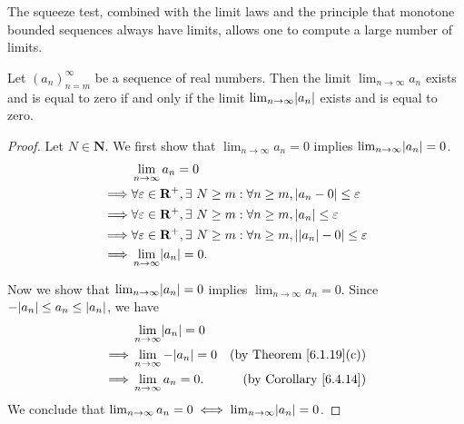 \setcounter{theorem}{15}
\begin{remark}\label{6.4.16}
    The squeeze test, combined with the limit laws and the principle that monotone bounded sequences always have limits, allows one to compute a large number of limits.
\end{remark}

\begin{corollary}\label{6.4.17}
    Let \((a_n)_{n = m}^\infty\) be a sequence of real numbers.
    Then the limit \(\lim_{n \to \infty} a_n\) exists and is equal to zero if and only if the limit \(\lim_{n \to \infty} \abs*{a_n}\) exists and is equal to zero.
\end{corollary}

\begin{proof}
    Let \(N \in \mathbf{N}\).
    We first show that \(\lim_{n \to \infty} a_n = 0\) implies \(\lim_{n \to \infty} \abs*{a_n} = 0\).
    \begin{align*}
                 & \lim_{n \to \infty} a_n = 0                                                                                        \\
        \implies & \forall \varepsilon \in \mathbf{R}^+, \exists\ N \geq m : \forall n \geq m, \abs*{a_n - 0} \leq \varepsilon        \\
        \implies & \forall \varepsilon \in \mathbf{R}^+, \exists\ N \geq m : \forall n \geq m, \abs*{a_n} \leq \varepsilon            \\
        \implies & \forall \varepsilon \in \mathbf{R}^+, \exists\ N \geq m : \forall n \geq m, \abs*{\abs*{a_n} - 0} \leq \varepsilon \\
        \implies & \lim_{n \to \infty} \abs*{a_n} = 0.
    \end{align*}

    Now we show that \(\lim_{n \to \infty} \abs*{a_n} = 0\) implies \(\lim_{n \to \infty} a_n = 0\).
    Since \(-\abs*{a_n} \leq a_n \leq \abs*{a_n}\), we have
    \begin{align*}
                 & \lim_{n \to \infty} \abs*{a_n} = 0                                        \\
        \implies & \lim_{n \to \infty} -\abs*{a_n} = 0 & \text{(by Theorem \ref{6.1.19}(c))} \\
        \implies & \lim_{n \to \infty} a_n = 0.        & \text{(by Corollary \ref{6.4.14})}
    \end{align*}
    We conclude that \(\lim_{n \to \infty} a_n = 0 \iff \lim_{n \to \infty} \abs*{a_n} = 0\).
\end{proof}

